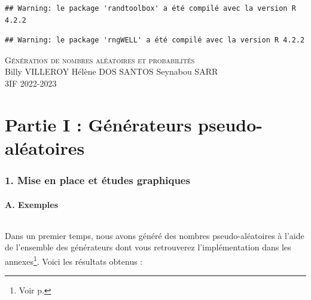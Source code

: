 \documentclass[
]{article}
\author{}
\date{\vspace{-2.5em}}
\begin{document}
\begin{verbatim}
## Warning: le package 'randtoolbox' a été compilé avec la version R 4.2.2
\end{verbatim}

\begin{verbatim}
## Warning: le package 'rngWELL' a été compilé avec la version R 4.2.2
\end{verbatim}

\thispagestyle{empty}
\begin{center}
  {\scshape \huge Génération de nombres aléatoires et probabilités\\}
  \vspace{2em}
  Billy VILLEROY Hélène DOS SANTOS Seynabou SARR\\
  3IF 2022-2023
\end{center}
\clearpage
\thispagestyle{empty}
\clearpage
\thispagestyle{empty}
\tableofcontents
\clearpage
\part*{Partie I : Générateurs pseudo-aléatoires}
\section*{1. Mise en place et études graphiques}

\subsection*{A. Exemples}

\paragraph{}

Dans un premier temps, nous avons généré des nombres pseudo-aléatoires à
l'aide de l'ensemble des générateurs dont vous retrouverez
l'implémentation dans les
annexes\footnote{Voir p. \pageref{part:annexes}}. Voici les résultats
obtenus :
\end{document}
